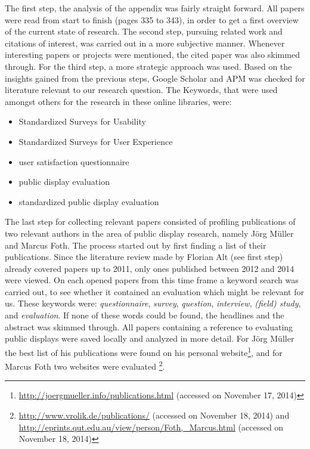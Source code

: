 	The first step, the analysis of the appendix was fairly straight forward. All papers were read from start to finish (pages 335 to 343), in order to get a first overview of the current state of research. 
	The second step, pursuing related work and citations of interest, was carried out in a more subjective manner. Whenever interesting papers or projects were mentioned, the cited paper was also skimmed through. 
	For the third step, a more strategic approach was used. Based on the insights gained from the previous steps, Google Scholar and APM was checked for literature relevant to our research question. The Keywords, that were used amongst others for the research in these online libraries, were:
	\begin{itemize}[itemsep=0pt] 
	\item Standardized Surveys for Usability
	\item Standardized Surveys for User Experience
	\item user satisfaction questionnaire
	\item public display evaluation
	\item standardized public display evaluation
	\end{itemize}

	The last step for collecting relevant papers consisted of profiling publications of two relevant authors in the area of public display research, namely J\"org M\"uller and Marcus Foth. The process started out by first finding a list of their publications. Since the literature review made by Florian Alt (see first step) already covered papers up to 2011, only ones published between 2012 and 2014 were viewed. 
	On each opened papers from this time frame a keyword search was carried out, to see whether it contained an evaluation which might be relevant for us. These keywords were: \textit{questionnaire}, \textit{survey}, \textit{question}, \textit{interview}, \textit{(field) study}, and \textit{evaluation}. If none of these words could be found, the headlines and the abstract was skimmed through. All papers containing a reference to evaluating public displays were saved locally and analyzed in more detail.
	For J\"org M\"uller the best list of his publications were found on his personal website\footnote{\url{http://joergmueller.info/publications.html} (accessed on November 17, 2014)}, and for Marcus Foth two websites were evaluated \footnote{\url{http://www.vrolik.de/publications/} (accessed on November 18, 2014) and \url{http://eprints.qut.edu.au/view/person/Foth,_Marcus.html} (accessed on November 18, 2014)}. 

